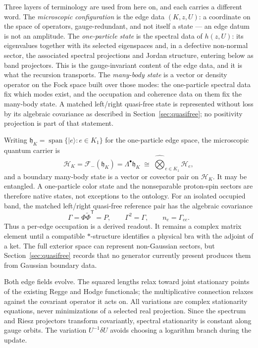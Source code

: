 \documentclass[11pt,letterpaper]{article}
\newcommand{\Fock}{\mathcal{F}_{-}}
\newcommand{\hh}{\mathfrak{h}}
\newcommand{\HK}{\mathcal{H}}
\begin{document}
Three layers of terminology are used from here on, and each carries a
different word. The \emph{microscopic configuration} is the edge data
$(K,z,U)$: a coordinate on the space of operators, gauge-redundant, and
not itself a state --- an edge datum is not an amplitude. The
\emph{one-particle state} is the spectral data of $h(z,U)$: its
eigenvalues together with its selected eigenspaces and, in a defective
non-normal sector, the associated spectral projections and Jordan structure,
entering below as band projectors. This is the gauge-invariant content of the
edge data, and it is what the recursion transports. The \emph{many-body state}
is a vector or density operator on the Fock space built over those modes: the
one-particle spectral data fix which modes exist, and the occupation and
coherence data on them fix the many-body state. A matched left/right
quasi-free state is represented without loss by its algebraic covariance as
described in Section~\ref{sec:quasifree}; no positivity projection is part of
that statement.

Writing $\hh_{K}=\operatorname{span}\{\lvert e\rangle : e\in K_{1}\}$ for the
one-particle edge space, the microscopic quantum carrier is
\begin{equation*}
  \HK_{K}=\Fock(\hh_{K})=\Lambda^{\bullet}\hh_{K}
  \;\cong\;\widehat{\bigotimes}_{e\in K_{1}}\HK_{e},
\end{equation*}
and a boundary many-body state is a vector or covector pair on $\HK_K$. It may
be entangled. A one-particle color state and the nonseparable proton-spin
sectors are therefore native states, not exceptions to the ontology. For an
isolated occupied band, the matched left/right quasi-free reference pair has
the algebraic covariance
\begin{equation*}
  \Gamma=\Phi\widetilde\Phi^{\mathsf T}=P,\qquad
  \Gamma^2=\Gamma,\qquad n_e=\Gamma_{ee}.
\end{equation*}
Thus a per-edge occupation is a derived readout. It remains a complex matrix
element until a compatible $*$-structure identifies a physical bra with the
adjoint of a ket. The full exterior space can represent non-Gaussian sectors,
but Section~\ref{sec:quasifree} records that no generator currently present
produces them from Gaussian boundary data.

Both edge fields evolve. The squared lengths relax toward joint stationary
points of the existing Regge and Hodge functionals; the multiplicative
connection relaxes against the covariant operator it acts on. All variations
are complex stationarity equations, never minimizations of a selected real
projection. Since the spectrum and Riesz projectors transform covariantly,
spectral stationarity is constant along gauge orbits. The variation
$U^{-1}\delta U$ avoids choosing a logarithm branch during the update.
\end{document}
